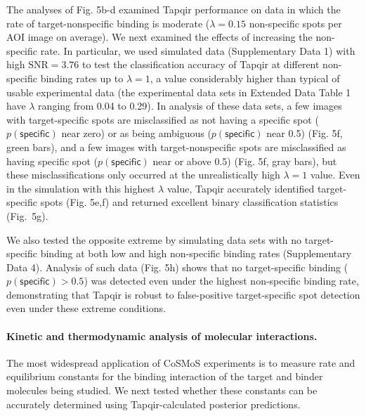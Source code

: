 The analyses of Fig. 5b-d examined Tapqir performance on data in which the rate of target-nonspecific binding is moderate ($\lambda = 0.15$ non-specific spots per AOI image on average).  We next examined the effects of increasing the non-specific rate.  In particular, we used simulated data (Supplementary Data 1) with high $\mathrm{SNR} = 3.76$ to test the classification accuracy of Tapqir at different non-specific binding rates up to $\lambda = 1$, a value considerably higher than typical of usable experimental data (the experimental data sets in Extended Data Table 1 have $\lambda$ ranging from 0.04 to 0.29).   In analysis of these data sets, a few images with target-specific spots are misclassified as not having a specific spot ($p(\mathsf{specific})$ near zero) or as being ambiguous ($p(\mathsf{specific})$ near 0.5) (Fig. 5f, green bars), and a few images with target-nonspecific spots are misclassified as having specific spot ($p(\mathsf{specific})$ near or above 0.5) (Fig. 5f, gray bars), but these misclassifications only occurred at the unrealistically high $\lambda = 1$ value.  Even in the simulation with this highest $\lambda$ value, Tapqir accurately identified target-specific spots (Fig. 5e,f) and returned excellent binary classification statistics (Fig.~5g). 

We also tested the opposite extreme by simulating data sets with no target-specific binding at both low and high non-specific binding rates (Supplementary Data 4). Analysis of such data (Fig. 5h) shows that no target-specific binding ($p(\mathsf{specific}) > 0.5$) was detected even under the highest non-specific binding rate, demonstrating that Tapqir is robust to false-positive target-specific spot detection even under these extreme conditions. 

\paragraph{Kinetic and thermodynamic analysis of molecular interactions.}
The most widespread application of CoSMoS experiments is to measure rate and equilibrium constants for the binding interaction of the target and binder molecules being studied.  We next tested whether these constants can be accurately determined using Tapqir-calculated posterior predictions. 

